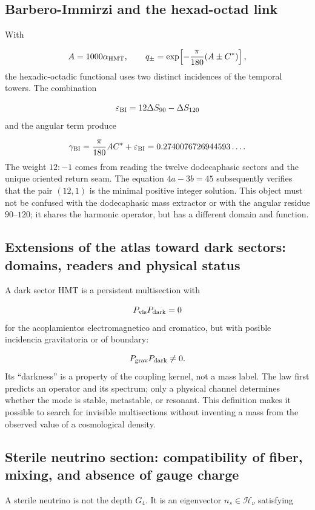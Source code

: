 \subsection{Barbero-Immirzi and the hexad-octad link}
With

\[
 A=1000\alpha_{\rm HMT},
\qquad
 q_\pm=\exp\!\left[-\frac{\pi}{180}(A\pm C^*)\right],
\]
the hexadic-octadic functional uses two distinct incidences of the temporal towers. The combination

\[
 \varepsilon_{\rm BI}
 =12\Delta S_{90}-\Delta S_{120}
\]
and the angular term produce

\[
 \gamma_{\rm BI}
 =\frac{\pi}{180}AC^*
 +\varepsilon_{\rm BI}
 =0.2740076726944593\ldots.
\]
The weight \(12:-1\) comes from reading the twelve dodecaphasic sectors
and the unique oriented return seam. The equation
\(4a-3b=45\) subsequently verifies that the pair \((12,1)\) is the minimal
positive integer solution. This object must not be confused with the dodecaphasic mass extractor or with the angular residue \(90\)--\(120\); it shares the harmonic operator, but has a different domain and function.

\subsection{Extensions of the atlas toward dark sectors: domains, readers and physical status}
A dark sector HMT is a persistent multisection with

\[
 P_{\rm vis}P_{\rm dark}=0
\]
for the acoplamientos electromagnetico and cromatico, but with posible incidencia gravitatoria or of boundary:

\[
 P_{\rm grav}P_{\rm dark}\ne0.
\]
Its “darkness” is a property of the coupling kernel, not a mass label. The law first predicts an operator and its spectrum; only a physical channel determines whether the mode is stable, metastable, or resonant. This definition makes it possible to search for invisible multisections without inventing a mass from the observed value of a cosmological density.

\subsection{Sterile neutrino section: compatibility of fiber, mixing, and absence of gauge charge}
A sterile neutrino is not the depth \(G_4\). It is an eigenvector \(n_s\in\mathcal H_\nu\) satisfying

